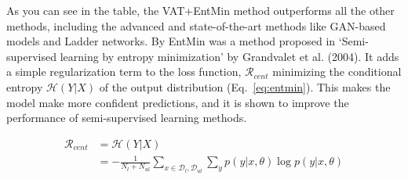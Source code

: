 \documentclass[paper=a4, fontsize=11pt]{scrartcl}
\numberwithin{equation}{section}		%
\numberwithin{figure}{section}			%
\numberwithin{table}{section}				%
\begin{document}
\begin{table}[H]
\centering
\caption{Test performance of semi-supervised learning
methods.}
\label{tab:semisup}
\end{table}

As you can see in the table, the VAT+EntMin method outperforms all the other methods, including the advanced and state-of-the-art methods like GAN-based models and Ladder networks.
By EntMin was a method proposed in `Semi-supervised learning by entropy minimization' by Grandvalet et al. (2004).
It adds a simple regularization term to the loss function, \(\mathcal{R}_{cent}\) minimizing the conditional entropy \(\mathcal{H}(Y|X)\) of the output distribution (Eq.~\eqref{eq:entmin}). This makes the model make more confident predictions, and it is shown to improve the performance of semi-supervised learning methods.

\begin{align}
  \label{eq:entmin}
  \mathcal{R}_{cent} &= \mathcal{H}(Y|X)\\
  &= -\frac{1}{N_l + N_{ul}} \sum_{x\in \mathcal{D}_l, \mathcal{D}_{ul}}\sum_{y} p(y|x, \theta) \log p(y|x, \theta)
\end{align}
\end{document}
